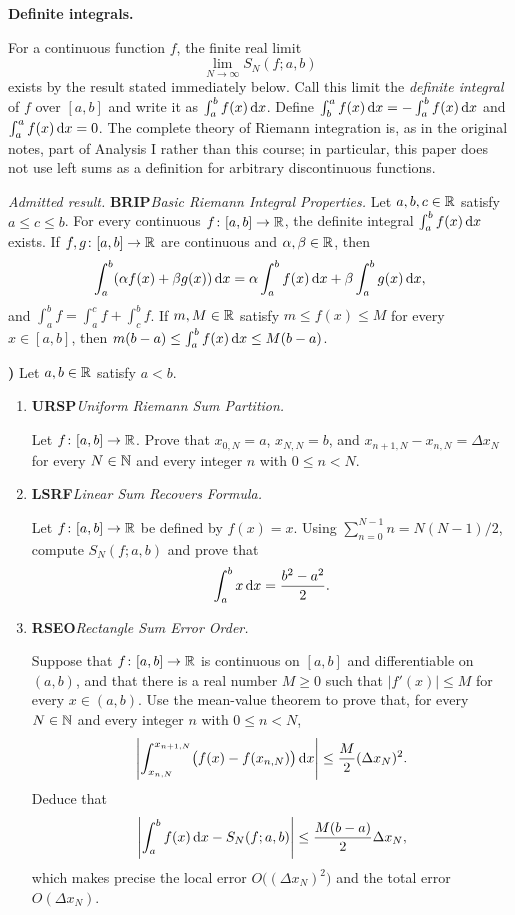 \documentclass[10pt,a4paper]{article}
\newcounter{examquestion}
\newcommand{\examquestion}[1]{%
  \Needspace{5\baselineskip}%
  \refstepcounter{examquestion}%
  \par\addvspace{0.8\baselineskip}%
  \noindent\textbf{\theexamquestion)}\enspace #1\par
}
\newenvironment{subquestions}
  {\begin{enumerate}[label=\alph*),leftmargin=2.1em]}
  {\end{enumerate}}
\newcommand{\nameditem}[2]{%
  \textbf{\textsf{#1}}\enspace\emph{#2.}\enspace
}
\newcommand{\admitted}[3]{%
  \par\smallskip\noindent\emph{Admitted result.}\enspace
  \nameditem{#1}{#2}#3\par
}
\newcommand{\concept}[1]{%
  \par\addvspace{0.55\baselineskip}\noindent\textbf{#1.}\enspace
}
\begin{document}
\concept{Definite integrals}
For a continuous function $f$, the finite real limit
\[
  \lim_{N\to\infty}S_N(f;a,b)
\]
exists by the result stated immediately below.  Call this limit the
\emph{definite integral} of $f$ over $[a,b]$ and write it as
$\int_a^b f(x)\,\mathrm{d} x$.  Define
$\int_b^a f(x)\,\mathrm{d} x=-\int_a^b f(x)\,\mathrm{d} x$ and
$\int_a^a f(x)\,\mathrm{d} x=0$.  The complete theory of Riemann integration is,
as in the original notes, part of Analysis I rather than this course; in
particular, this paper does not use left sums as a definition for arbitrary
discontinuous functions.

\admitted{BRIP}{Basic Riemann Integral Properties}{Let $a,b,c\in\mathbb{R}$ satisfy
$a\leq c\leq b$.  For every continuous $f\colon[a,b]\to\mathbb{R}$, the definite
integral $\int_a^b f(x)\,\mathrm{d} x$ exists.  If $f,g\colon[a,b]\to\mathbb{R}$ are
continuous and
$\alpha,\beta\in\mathbb{R}$, then
\[
  \int_a^b(\alpha f(x)+\beta g(x))\,\mathrm{d} x
  =\alpha\int_a^b f(x)\,\mathrm{d} x+\beta\int_a^b g(x)\,\mathrm{d} x,
\]
and $\int_a^b f=\int_a^c f+\int_c^b f$.  If $m,M\in\mathbb{R}$ satisfy
$m\leq f(x)\leq M$ for every $x\in[a,b]$, then
$m(b-a)\leq\int_a^b f(x)\,\mathrm{d} x\leq M(b-a)$.}

\examquestion{\label{q:riemann-sums}
Let $a,b\in\mathbb{R}$ satisfy $a<b$.
\begin{subquestions}
  \item \nameditem{URSP}{Uniform Riemann Sum Partition}
  Let $f\colon[a,b]\to\mathbb{R}$.
  Prove that $x_{0,N}=a$, $x_{N,N}=b$, and
  $x_{n+1,N}-x_{n,N}=\Delta x_N$ for every $N\in\mathbb{N}$ and every integer
  $n$ with $0\leq n<N$.

  \item \nameditem{LSRF}{Linear Sum Recovers Formula}
  Let $f\colon[a,b]\to\mathbb{R}$ be defined by $f(x)=x$.  Using
  $\sum_{n=0}^{N-1}n=N(N-1)/2$, compute $S_N(f;a,b)$ and prove that
  \[
    \int_a^b x\,\mathrm{d} x=\frac{b^2-a^2}{2}.
  \]

  \item \nameditem{RSEO}{Rectangle Sum Error Order}
  Suppose that $f\colon[a,b]\to\mathbb{R}$ is continuous on $[a,b]$ and
  differentiable on $(a,b)$, and that there is a real number $M\geq0$ such
  that $|f'(x)|\leq M$ for every $x\in(a,b)$.
  Use the mean-value theorem to prove that, for every $N\in\mathbb{N}$ and every
  integer $n$ with $0\leq n<N$,
  \[
    \left|\int_{x_{n,N}}^{x_{n+1,N}}
      \bigl(f(x)-f(x_{n,N})\bigr)\,\mathrm{d} x\right|
      \leq \frac{M}{2}(\Delta x_N)^2.
  \]
  Deduce that
  \[
    \left|\int_a^b f(x)\,\mathrm{d} x-S_N(f;a,b)\right|
      \leq\frac{M(b-a)}{2}\Delta x_N,
  \]
  which makes precise the local error $O\bigl((\Delta x_N)^2\bigr)$ and the
  total error $O(\Delta x_N)$.
\end{subquestions}}
\end{document}
